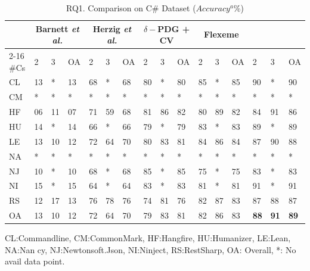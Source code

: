 \begin{table}[t]
	\caption{RQ1. Comparison on C\# Dataset ($Accuracy^a$\%)}
	\vspace{-0.1in}
	\begin{center}
		\footnotesize
		\tabcolsep 4pt
		\renewcommand{\arraystretch}{1} \begin{tabular}{p{0.2cm}<{\centering}|p{0.25cm}<{\centering}p{0.25cm}<{\centering}p{0.25cm}<{\centering}|p{0.25cm}<{\centering}p{0.25cm}<{\centering}p{0.25cm}<{\centering}|p{0.25cm}<{\centering}p{0.25cm}<{\centering}p{0.25cm}<{\centering}|p{0.25cm}<{\centering}p{0.25cm}<{\centering}p{0.25cm}<{\centering}|p{0.25cm}<{\centering}p{0.25cm}<{\centering}p{0.25cm}<{\centering}}
			
			\hline
			\multirow{2}{*}{}          & \multicolumn{3}{c|}{Barnett {\em et al.}} & \multicolumn{3}{c|}{Herzig {\em et al.}} & \multicolumn{3}{c|}{$\delta-$PDG + CV} & \multicolumn{3}{c|}{Flexeme} & \multicolumn{3}{c}{\bf {\tool}}\\
			\cline{2-16}
		\#Cs	& 2 & 3 & OA & 2 & 3 & OA & 2 & 3 & OA & 2 & 3 & OA & 2 & 3 & OA \\
			\hline
			CL   & 13 & *    & 13 & 68 & *    & 68 & 80 & *    & 80 & 85 & *    & 85 & 90 & *    & 90 \\
			CM   & *    & *    & *    & *    & *    & *    & *    & *    & *    & *    & *    & *    & *    & *    & *    \\
			HF   & 06 & 11 & 07 & 71 & 59 & 68 & 81 & 86 & 82 & 80 & 89 & 82 & 84 & 91 & 86 \\
			HU   & 14 & *    & 14 & 66 & *    & 66 & 79 & *    & 79 & 83 & *    & 83 & 89 & *    & 89 \\
			LE   & 13 & 10 & 12 & 72 & 64 & 70 & 80 & 83 & 81 & 84 & 86 & 84 & 87 & 90 & 88\\
			NA   & *    & *    & *    & *    & *    & *    & *    & *    & *    & *    & *    & *    & *    & *    & *    \\
			NJ   & 10 & *    & 10 & 68 & *    & 68 & 85 & *    & 85 & 75 & *    & 75 & 83 & *    & 83 \\
			NI   & 15 & *    & 15 & 64 & *    & 64 & 83 & *    & 83 & 81 & *    & 81 & 91 & *    & 91 \\
			RS   & 12 & 17 & 13 & 76 & 78 & 76 & 74 & 81 & 76 & 82 & 87 & 83 & 87 & 88 & 87\\
			\hline
			OA   & 13 & 10 & 12 & 72 & 64 & 70 & 79 & 83 & 81 & 82 & 86 & 83 & {\bf 88} & {\bf 91} & {\bf 89} \\
			\hline
		\end{tabular}
		\label{RQ1-result-2}
		CL:Commandline, CM:CommonMark, HF:Hangfire, HU:Humanizer, LE:Lean, NA:Nan cy, NJ:Newtonsoft.Json, NI:Ninject, RS:RestSharp, OA: Overall, *: No avail data point.
	\end{center}
\end{table}


